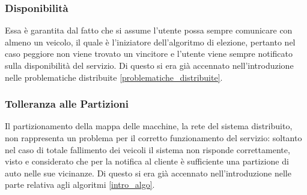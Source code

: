 \subsubsection{Disponibilità}
Essa è garantita dal fatto che si assume l'utente possa sempre comunicare con almeno un veicolo, il quale è l'iniziatore dell'algoritmo di elezione, pertanto nel caso peggiore non viene trovato un vincitore e l'utente viene sempre notificato sulla disponibilità del servizio. Di questo si era già accennato nell'introduzione nelle problematiche distribuite \ref{problematiche_distribuite}.

\subsubsection{Tolleranza alle Partizioni}
Il partizionamento della mappa delle macchine, la rete del sistema distribuito, non rappresenta un problema per il corretto funzionamento del servizio:  soltanto nel caso di totale fallimento dei veicoli il sistema non risponde correttamente, visto e considerato che per la notifica al cliente è sufficiente una partizione di auto nelle sue vicinanze. Di questo si era già accennato nell'introduzione nelle parte relativa agli algoritmi \ref{intro_algo}.
